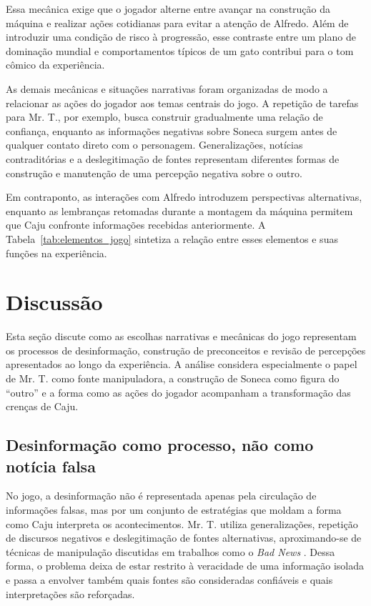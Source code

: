 \documentclass[12pt]{article}
\begin{document}


Essa mecânica exige que o jogador alterne entre avançar na construção da máquina e realizar ações cotidianas para evitar a atenção de Alfredo. Além de introduzir uma condição de risco à progressão, esse contraste entre um plano de dominação mundial e comportamentos típicos de um gato contribui para o tom cômico da experiência.

As demais mecânicas e situações narrativas foram organizadas de modo a relacionar as ações do jogador aos temas centrais do jogo. A repetição de tarefas para Mr. T., por exemplo, busca construir gradualmente uma relação de confiança, enquanto as informações negativas sobre Soneca surgem antes de qualquer contato direto com o personagem. Generalizações, notícias contraditórias e a deslegitimação de fontes representam diferentes formas de construção e manutenção de uma percepção negativa sobre o outro.



Em contraponto, as interações com Alfredo introduzem perspectivas alternativas, enquanto as lembranças retomadas durante a montagem da máquina permitem que Caju confronte informações recebidas anteriormente. A Tabela~\ref{tab:elementos_jogo} sintetiza a relação entre esses elementos e suas funções na experiência.


\section{Discussão}

Esta seção discute como as escolhas narrativas e mecânicas do jogo representam os processos de desinformação, construção de preconceitos e revisão de percepções apresentados ao longo da experiência. A análise considera especialmente o papel de Mr. T. como fonte manipuladora, a construção de Soneca como figura do ``outro'' e a forma como as ações do jogador acompanham a transformação das crenças de Caju.

\subsection{Desinformação como processo, não como notícia falsa}
No jogo, a desinformação não é representada apenas pela circulação de informações falsas, mas por um conjunto de estratégias que moldam a forma como Caju interpreta os acontecimentos. Mr. T. utiliza generalizações, repetição de discursos negativos e deslegitimação de fontes alternativas, aproximando-se de técnicas de manipulação discutidas em trabalhos como o \textit{Bad News} \cite{bad_news}. Dessa forma, o problema deixa de estar restrito à veracidade de uma informação isolada e passa a envolver também quais fontes são consideradas confiáveis e quais interpretações são reforçadas.
\end{document}
